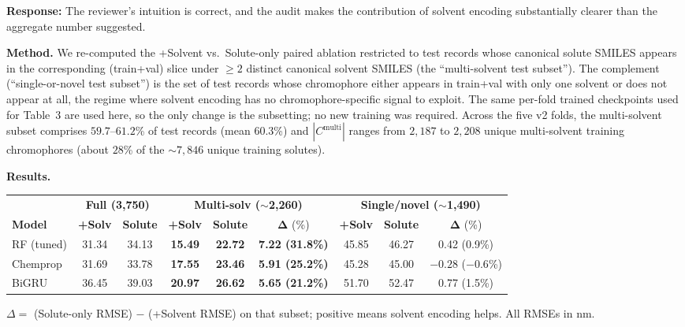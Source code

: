 \documentclass[11pt]{article}
\newcommand{\response}[1]{\noindent\textbf{Response:} #1\par\medskip}
\begin{document}
\response{The reviewer's intuition is correct, and the audit makes the contribution of solvent encoding substantially clearer than the aggregate number suggested.

\textbf{Method.} We re-computed the +Solvent vs.\ Solute-only paired ablation restricted to test records whose canonical solute SMILES appears in the corresponding (train+val) slice under $\geq 2$ distinct canonical solvent SMILES (the ``multi-solvent test subset''). The complement (``single-or-novel test subset'') is the set of test records whose chromophore either appears in train+val with only one solvent or does not appear at all, the regime where solvent encoding has no chromophore-specific signal to exploit. The same per-fold trained checkpoints used for Table~3 are used here, so the only change is the subsetting; no new training was required. Across the five v2 folds, the multi-solvent subset comprises $59.7$--$61.2$\% of test records (mean $60.3$\%) and $|C^{\text{multi}}|$ ranges from $2{,}187$ to $2{,}208$ unique multi-solvent training chromophores (about $28$\% of the $\sim$$7{,}846$ unique training solutes).

\textbf{Results.}

\begin{center}\small
\begin{tabular}{lcccccccc}
\toprule
& \multicolumn{2}{c}{\textbf{Full (3{,}750)}} & \multicolumn{3}{c}{\textbf{Multi-solv ($\sim$2{,}260)}} & \multicolumn{3}{c}{\textbf{Single/novel ($\sim$1{,}490)}} \\
\cmidrule(lr){2-3} \cmidrule(lr){4-6} \cmidrule(lr){7-9}
\textbf{Model} & \textbf{+Solv} & \textbf{Solute} & \textbf{+Solv} & \textbf{Solute} & $\boldsymbol{\Delta}$ (\%) & \textbf{+Solv} & \textbf{Solute} & $\boldsymbol{\Delta}$ (\%) \\
\midrule
RF (tuned) & 31.34 & 34.13 & \textbf{15.49} & \textbf{22.72} & \textbf{7.22 (31.8\%)} & 45.85 & 46.27 & 0.42 (0.9\%) \\
Chemprop   & 31.69 & 33.78 & \textbf{17.55} & \textbf{23.46} & \textbf{5.91 (25.2\%)} & 45.28 & 45.00 & $-0.28$ ($-0.6$\%) \\
BiGRU      & 36.45 & 39.03 & \textbf{20.97} & \textbf{26.62} & \textbf{5.65 (21.2\%)} & 51.70 & 52.47 & 0.77 (1.5\%) \\
\bottomrule
\end{tabular}
\end{center}

\noindent
$\Delta = $ (Solute-only RMSE) $-$ (+Solvent RMSE) on that subset; positive means solvent encoding helps. All RMSEs in nm.

}
\end{document}
